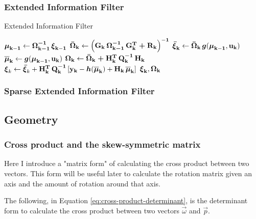 \documentclass[12pt]{article}
\begin{document}
\subsubsection{Extended Information Filter}
\begin{algorithm}[h]
\caption{Extended Information Filter}
\label{alg:information-filter}
\begin{algorithmic}[1]
\State ${\boldsymbol{\mu}}_\mathbf{k-1} \gets \boldsymbol{\mathbf{\Omega_{k-1}^{-1}}}  \, {\boldsymbol{\xi}}_\mathbf{k-1}$
\State $\boldsymbol{\mathbf{\bar{\Omega}_k}} \gets \left(\boldsymbol{\mathbf{G_k \, \Omega_{k-1}^{-1} \, G_k^T + R_k}}\right)^\mathbf{-1}$
\State ${\boldsymbol{\bar{\xi}}}_{\mathbf{k}} \gets \boldsymbol{\mathbf{\bar{\Omega}_k}} \, {\boldsymbol{g}}({\boldsymbol{\mu}}_\mathbf{k-1}, \boldsymbol{\mathbf{u_k}})$
\State ${\boldsymbol{\overline{\mu}}}_\mathbf{k} \gets  {\boldsymbol{g}}({\boldsymbol{\mu}}_\mathbf{k-1}, \boldsymbol{\mathbf{u_k}})$
\State $\boldsymbol{\mathbf{\Omega_k}} \gets \boldsymbol{\mathbf{\bar{\Omega}_k + H_k^T \, Q_k^{-1} \, H_k}}$
\State ${\boldsymbol{\xi}}_k \gets {\boldsymbol{\bar{\xi}}}_k + \boldsymbol{\mathbf{H_k^T\, Q_k^{-1}}} \left[\boldsymbol{\mathbf{y_k}} - {\boldsymbol{h}}({\boldsymbol{\overline{\mu}}}_\mathbf{k}) + \boldsymbol{\mathbf{H_k}}\,{\boldsymbol{\overline{\mu}}}_\mathbf{k}\right]$
\State \Return ${\boldsymbol{\xi}}_\mathbf{k}, \boldsymbol{\mathbf{\Omega_k}}$
\EndProcedure
\end{algorithmic}
\end{algorithm}

\subsubsection{Sparse Extended Information Filter}

\subsection{Geometry}
\subsubsection{Cross product and the skew-symmetric matrix}
Here I introduce a "matrix form" of calculating the cross product between two vectors. This form will be useful later to calculate the rotation matrix given an axis and the amount of rotation around that axis.

The following, in Equation \ref{eq:cross-product-determinant}, is the determinant form to calculate the cross product between two vectors $\vec{\omega}$ and $\vec{p}$.
\end{document}
